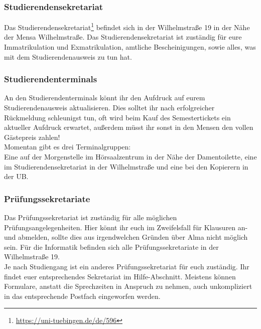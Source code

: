 \subsubsection*{Studierendensekretariat}
Das Studierendensekretariat\footnote{\url{https://uni-tuebingen.de/de/596}} befindet sich in der Wilhelmstraße 19 in der Nähe der Mensa Wilhelmstraße. Das Studierendensekretariat ist zuständig für eure Immatrikulation und Exmatrikulation, amtliche Bescheinigungen, sowie alles, was mit dem Studierendenausweis zu tun hat.	%

\subsubsection*{Studierendenterminals}
An den Studierendenterminals könnt ihr den Aufdruck auf eurem
Studierendenausweis aktualisieren. Dies solltet ihr nach erfolgreicher Rückmeldung schleunigst tun, oft wird beim Kauf des Semestertickets ein aktueller Aufdruck erwartet, außerdem müsst ihr sonst in den Mensen
den vollen Gästepreis zahlen!\\
Momentan gibt es drei Terminalgruppen:\\
Eine auf der Morgenstelle im Hörsaalzentrum in der Nähe der Damentoilette,
eine im Studierendensekretariat in der Wilhelmstraße und eine bei den Kopierern in der UB.

\subsubsection*{Prüfungssekretariate}
Das Prüfungssekretariat ist zuständig für alle möglichen Prüfungsangelegenheiten. Hier könnt ihr euch im Zweifelsfall für Klausuren an- und abmelden, sollte dies aus irgendwelchen Gründen über Alma nicht möglich sein. Für die Informatik befinden sich alle Prüfungssekretariate in der Wilhelmstraße 19.\\
Je nach Studiengang ist ein anderes Prüfungssekretariat für euch zuständig. Ihr findet euer entsprechendes Sekretariat im Hilfe-Abschnitt. Meistens können Formulare, anstatt die Sprechzeiten in Anspruch zu nehmen, auch unkompliziert in das entsprechende Postfach eingeworfen werden.



